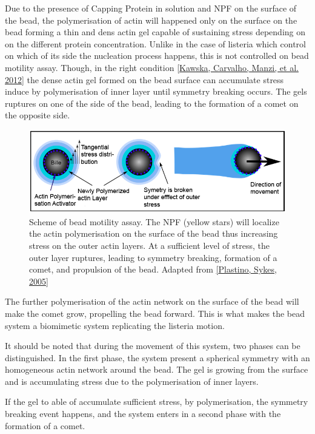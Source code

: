 \documentclass[A4paperpaper,11pt,english]{sphinxmanual}
\begin{document}
Due to the presence of Capping Protein in solution and NPF on the surface of
the bead, the polymerisation of actin will happened only on the surface on the
bead forming a thin and dens actin gel capable of sustaining stress depending
on on the different protein concentration. Unlike in the case of listeria which
control on which of its side the nucleation process happens, this is not
controlled on bead motility assay. Though, in the right condition
{\hyperref[parts/part1:kawska2012]{{[}Kawska, Carvalho, Manzi,  et al.  2012{]}}} the dense actin gel formed on the bead surface can
accumulate stress induce by polymerisation of inner layer until symmetry
breaking occurs. The gels ruptures on one of the side of the bead, leading to
the formation of a comet on the opposite side.
\begin{figure}[htbp]
\centering
\capstart

\includegraphics[width=0.600\linewidth]{Plastino-Sykes-2005.png}
\caption{Scheme of bead motility assay. The NPF (yellow stars) will localize the
actin polymerisation on the surface of the bead thus increasing stress on
the outer actin layers. At a sufficient level of stress, the outer layer
ruptures, leading to symmetry breaking, formation of a comet, and
propulsion of the bead. Adapted from {\hyperref[parts/part1:plastino2005]{{[}Plastino, Sykes,  2005{]}}}}\end{figure}

The further polymerisation of the actin network on the surface of the bead will
make the comet grow, propelling the bead forward. This is what makes the bead
system a biomimetic system replicating the listeria motion.

It should be noted that during the movement of this system, two phases can be
distinguished. In the first phase, the system present a spherical symmetry with
an homogeneous actin  network around the bead. The gel is growing from the
surface and is accumulating stress due to the polymerisation of inner layers.

If the gel to able of accumulate sufficient stress, by polymerisation,  the symmetry breaking event happens, and the system enters in
a second phase with the formation of a comet.
\end{document}
